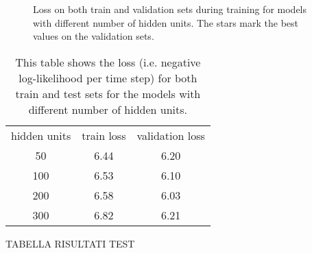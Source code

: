 \begin{figure}
	\centering
\resizebox{15cm}{!}{
	
}
\caption{Loss on both train and validation sets during training for models with different number of hidden units. The stars mark the best values on the validation sets.}
\label{fig:overfitting_muse}
\end{figure}

\begin{table}
	\centering
\begin{tabular}{c | c | c}
	hidden units & train loss & validation loss \\
	50 & 6.44 & 6.20  \\
	100 & 6.53 & 6.10 \\
	200 & 6.58 & 6.03 \\
	300 & 6.82 & 6.21 \\
\end{tabular}
\caption{This table shows the loss (i.e. negative log-likelihood per time step) for both train and test sets for the models with different number of hidden units.}
\label{table:losses_n_hidden}
\end{table}


TABELLA RISULTATI TEST

